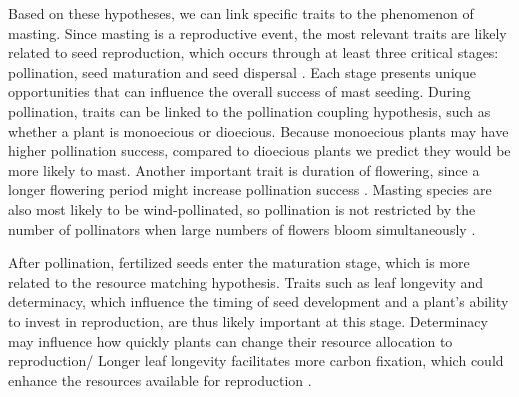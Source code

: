\documentclass[11pt,letter]{article}
\begin{document}
Based on these hypotheses, we can link specific traits to the phenomenon of masting. Since masting is a reproductive event, the most relevant traits are likely related to seed reproduction, which occurs through at least three critical stages: pollination, seed maturation and seed dispersal \citep{satake2021studying}. Each stage presents unique opportunities that can influence the overall success of mast seeding. During pollination, traits can be linked to the pollination coupling hypothesis, such as whether a plant is monoecious or dioecious. Because monoecious plants may have higher pollination success, compared to dioecious plants  \citep[where separate genders for each individual plant may reduce pollination success in low-density populations,][]{bawa1980evolution} we predict they would be more likely to mast. %
 Another important trait is duration of flowering, since a longer flowering period might increase pollination success \citep{knight2005pollen}. %
  Masting species are also most likely to be wind-pollinated, so pollination is not restricted by the number of pollinators when large numbers of flowers bloom simultaneously \citep{bogdziewicz2017masting, bogdziewicz2020flowering}.\par
After pollination, fertilized seeds enter the maturation stage, which is more related to the resource matching hypothesis. Traits such as leaf longevity and determinacy, which influence the timing of seed development and a plant's ability to invest in reproduction, are thus likely important at this stage. Determinacy \citep[whether the leaf material is prebuilt or not,][]{lechowicz1984temperate} may influence how quickly plants can change their resource allocation to reproduction/  Longer leaf longevity facilitates more carbon fixation, which could enhance the resources available for reproduction \citep{adler2014functional}. \par 
\end{document}
